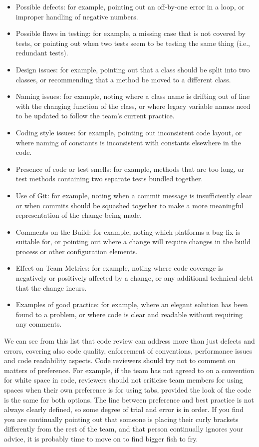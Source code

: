 \documentclass[
]{book}
\providecommand{\tightlist}{%
  \setlength{\itemsep}{0pt}\setlength{\parskip}{0pt}}
\begin{document}
\begin{itemize}
\tightlist
\item
  Possible defects: for example, pointing out an off-by-one error in a loop, or improper handling of negative numbers.
\item
  Possible flaws in testing: for example, a missing case that is not covered by tests, or pointing out when two tests seem to be testing the same thing (i.e., redundant tests).
\item
  Design issues: for example, pointing out that a class should be split into two classes, or recommending that a method be moved to a different class.
\item
  Naming issues: for example, noting where a class name is drifting out of line with the changing function of the class, or where legacy variable names need to be updated to follow the team's current practice.
\item
  Coding style issues: for example, pointing out inconsistent code layout, or where naming of constants is inconsistent with constants elsewhere in the code.
\item
  Presence of code or test smells: for example, methods that are too long, or test methods containing two separate tests bundled together.
\item
  Use of Git: for example, noting when a commit message is insufficiently clear or when commits should be squashed together to make a more meaningful representation of the change being made.
\item
  Comments on the Build: for example, noting which platforms a bug-fix is suitable for, or pointing out where a change will require changes in the build process or other configuration elements.
\item
  Effect on Team Metrics: for example, noting where code coverage is negatively or positively affected by a change, or any additional technical debt that the change incurs.
\item
  Examples of good practice: for example, where an elegant solution has been found to a problem, or where code is clear and readable without requiring any comments.
\end{itemize}

We can see from this list that code review can address more than just defects and errors, covering also code quality, enforcement of conventions, performance issues and code readability aspects. Code reviewers should try not to comment on matters of preference. For example, if the team has not agreed to on a convention for white space in code, reviewers should not criticise team members for using spaces when their own preference is for using tabs, provided the look of the code is the same for both options. The line between preference and best practice is not always clearly defined, so some degree of trial and error is in order. If you find you are continually pointing out that someone is placing their curly brackets differently from the rest of the team, and that person continually ignores your advice, it is probably time to move on to find bigger fish to fry.
\end{document}
